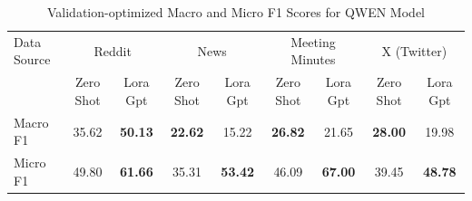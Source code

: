 \begin{table}[htbp]
\centering
\begin{tabular}{l *{8}{c}}
\toprule
Data Source & \multicolumn{2}{c}{Reddit} & \multicolumn{2}{c}{News} & \multicolumn{2}{c}{Meeting Minutes} & \multicolumn{2}{c}{X (Twitter)} \\
& Zero Shot & Lora Gpt & Zero Shot & Lora Gpt & Zero Shot & Lora Gpt & Zero Shot & Lora Gpt \\
\midrule
Macro F1 & 35.62 & \textbf{50.13} & \textbf{22.62} & 15.22 & \textbf{26.82} & 21.65 & \textbf{28.00} & 19.98 \\
Micro F1 & 49.80 & \textbf{61.66} & 35.31 & \textbf{53.42} & 46.09 & \textbf{67.00} & 39.45 & \textbf{48.78} \\
\bottomrule
\end{tabular}
\centering\caption{Validation-optimized Macro and Micro F1 Scores for QWEN Model}
\label{tab:qwen_macro_micro}
\end{table}